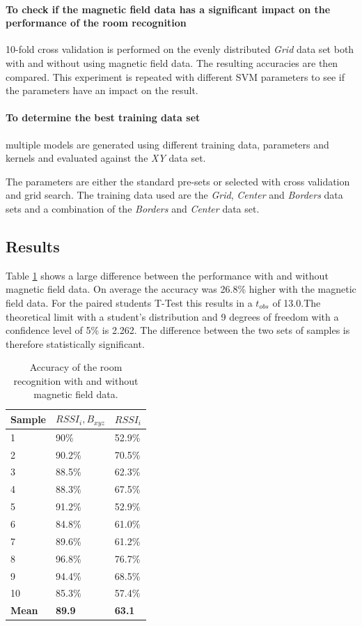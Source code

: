 \paragraph{To check if the magnetic field data has a significant impact on the performance of the room recognition} 10-fold cross validation is performed on the evenly distributed \emph{Grid} data set both with and without using magnetic field data. The resulting accuracies are then compared. This experiment is repeated with different SVM parameters to see if the parameters have an impact on the result. 

\paragraph{To determine the best training data set} multiple models are generated using different training data, parameters and kernels and evaluated against the \emph{XY} data set.

The parameters are either the standard pre-sets or selected with cross validation and grid search. The training data used are the \emph{Grid}, \emph{Center} and \emph{Borders} data sets and a combination of the \emph{Borders} and \emph{Center} data set.

\subsection{Results}

Table \ref{tab:RoomRecognitionMagneticField} shows a large difference between the performance with and without magnetic field data. On average the accuracy was 26.8\% higher with the magnetic field data. For the paired students T-Test this results in a $t_{obs}$ of 13.0.The theoretical limit with a student's distribution and 9 degrees of freedom with a confidence level of 5\% is 2.262. The difference between the two sets of samples is therefore statistically significant.

\begin{table}
\centering
\begin{tabular}{l l l}
\toprule
\textbf{Sample}&\boldmath$RSSI_{i},B_{xyz}$&\boldmath$RSSI_{i}$ \\
\midrule
1&90\%&52.9\% \\
2&90.2\%&70.5\% \\
3&88.5\%&62.3\% \\
4&88.3\%&67.5\% \\
5&91.2\%&52.9\% \\
6&84.8\%&61.0\% \\
7&89.6\%&61.2\% \\
8&96.8\%&76.7\% \\
9&94.4\%&68.5\% \\
10&85.3\%&57.4\% \\
\textbf{Mean}&\textbf{89.9}&\textbf{63.1} \\
\bottomrule
\end{tabular}
\caption[Room Recognition - Magnetic Field]{Accuracy of the room recognition with and without magnetic field data.}
\label{tab:RoomRecognitionMagneticField}
\end{table}

